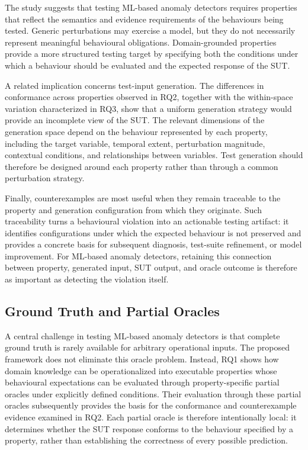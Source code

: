 \documentclass[preprint,12pt]{elsarticle}
\begin{document}
The study suggests that testing ML-based anomaly detectors requires
properties that reflect the semantics and evidence requirements of the
behaviours being tested. Generic perturbations may exercise a model, but
they do not necessarily represent meaningful behavioural obligations.
Domain-grounded properties provide a more structured testing target by
specifying both the conditions under which a behaviour should be evaluated
and the expected response of the SUT.

A related implication concerns test-input generation. The differences in
conformance across properties observed in RQ2, together with the
within-space variation characterized in RQ3, show that a uniform generation
strategy would provide an incomplete view of the SUT.
The relevant dimensions of the generation space depend on the behaviour
represented by each property, including the target variable, temporal extent,
perturbation magnitude, contextual conditions, and relationships between
variables.
Test generation should therefore be designed around each property rather
than through a common perturbation strategy.

Finally, counterexamples are most useful when they remain traceable to the
property and generation configuration from which they originate. Such
traceability turns a behavioural violation into an actionable testing
artifact: it identifies configurations under which the expected behaviour is not preserved and provides a concrete basis for subsequent diagnosis,
test-suite refinement, or model improvement. For ML-based anomaly
detectors, retaining this connection between property, generated input,
SUT output, and oracle outcome is therefore as important as detecting the
violation itself.

\subsection{Ground Truth and Partial Oracles}
\label{sec:discussion_partial_oracles}

A central challenge in testing ML-based anomaly detectors is that complete
ground truth is rarely available for arbitrary operational inputs. The
proposed framework does not eliminate this oracle problem. Instead, RQ1
shows how domain knowledge can be operationalized into executable properties
whose behavioural expectations can be evaluated through property-specific
partial oracles under explicitly defined conditions. Their evaluation
through these partial oracles subsequently provides the basis for the
conformance and counterexample evidence examined in RQ2. Each partial oracle
is therefore intentionally local: it determines whether the SUT response
conforms to the behaviour specified by a property, rather than establishing
the correctness of every possible prediction.
\end{document}
